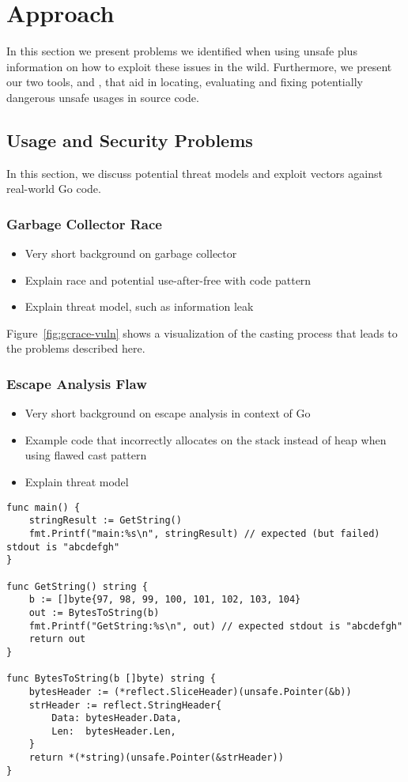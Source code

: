 \section{Approach}
\label{sec:appr}
In this section we present problems we identified when using unsafe plus information on how to exploit these issues in the wild.
Furthermore, we present our two tools, \toolUsage{} and \toolSA{}, that aid in locating, evaluating and fixing potentially dangerous unsafe usages in source code.

\subsection{Usage and Security Problems}
In this section, we discuss potential threat models and exploit vectors against real-world \unsafe{} Go code.

\subsubsection*{Garbage Collector Race}

\begin{itemize}
    \item Very short background on garbage collector
    \item Explain race and potential use-after-free with code pattern
    \item Explain threat model, such as information leak
\end{itemize}



Figure~\ref{fig:gcrace-vuln} shows a visualization of the casting process that leads to the problems described here.


\subsubsection*{Escape Analysis Flaw}

\begin{itemize}
    \item Very short background on escape analysis in context of Go
    \item Example code that incorrectly allocates on the stack instead of heap when using flawed cast pattern
    \item Explain threat model
\end{itemize}

\begin{lstlisting}
func main() {
	stringResult := GetString()
	fmt.Printf("main:%s\n", stringResult) // expected (but failed) stdout is "abcdefgh"
}

func GetString() string {
	b := []byte{97, 98, 99, 100, 101, 102, 103, 104}
	out := BytesToString(b)
	fmt.Printf("GetString:%s\n", out) // expected stdout is "abcdefgh"
	return out
}

func BytesToString(b []byte) string {
	bytesHeader := (*reflect.SliceHeader)(unsafe.Pointer(&b))
	strHeader := reflect.StringHeader{
		Data: bytesHeader.Data,
		Len:  bytesHeader.Len,
	}
	return *(*string)(unsafe.Pointer(&strHeader))
}
\end{lstlisting}


